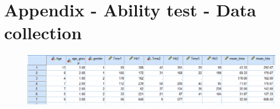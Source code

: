 \chapter{Appendix - Ability test - Data collection}

\begin{figure}[!ht]
\centering
\includegraphics[width=1\textwidth]{figures/SPSSDATA_simpl.png}
\end{figure}
